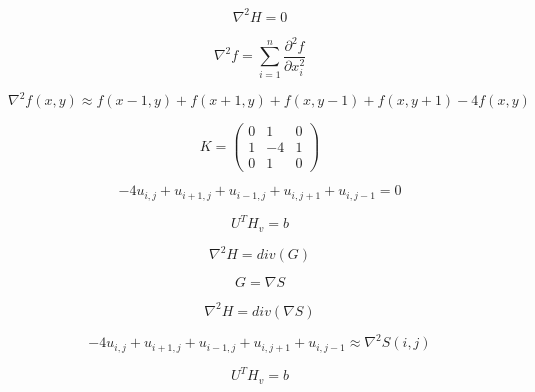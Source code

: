 \documentclass[a4paper,10pt]{article}
\begin{document}


\begin{equation*}
\nabla^2 H = 0
\end{equation*}

\begin{equation*}
 \nabla^2 f = \sum_{i=1}^n \frac{\partial^2 f}{\partial x_i^2}
\end{equation*}

\begin{equation*}
 \nabla^2 f(x,y) \approx f(x-1,y) + f(x+1,y) + f(x,y-1) + f(x,y+1) - 4f(x,y)
\end{equation*}

\begin{equation*}
K = 
\begin{pmatrix}
0 & 1 & 0 \\
1 & -4 & 1\\
0 & 1 & 0
\end{pmatrix}
\end{equation*}

\begin{equation*}
-4 u_{i,j} + u_{i+1,j} + u_{i-1,j} + u_{i,j+1} + u_{i,j-1} = 0
\end{equation*}

\begin{equation*}
 U^T H_v = b
\end{equation*}

\begin{equation*}
\nabla^2 H = div(G)
\end{equation*}

\begin{equation*}
G = \nabla S
\end{equation*}

\begin{equation*}
\nabla^2 H = div(\nabla S)
\end{equation*}

\begin{equation*}
-4 u_{i,j} + u_{i+1,j} + u_{i-1,j} + u_{i,j+1} + u_{i,j-1} \approx \nabla^2 S(i,j)
\end{equation*}

\begin{equation*}
 U^T H_v = b
\end{equation*}
\end{document}
